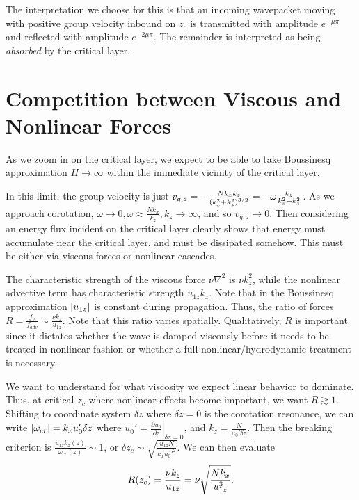 \documentclass[11pt,
        usenames, %
        dvipsnames %
    ]{report}
\newcommand*{\pd}[2]{\frac{\partial#1}{\partial#2}}
\newcommand*{\at}[1]{\left.#1\right|}
\DeclarePairedDelimiter\abs{\lvert}{\rvert}
\DeclarePairedDelimiter\p{\lparen}{\rparen}
\begin{document}
The interpretation we choose for this is that an incoming wavepacket moving with
positive group velocity inbound on $z_c$ is transmitted with amplitude $e^{-\mu
\pi}$ and reflected with amplitude $e^{-2\mu \pi}$. The remainder is interpreted
as being \emph{absorbed} by the critical layer.

\section{Competition between Viscous and Nonlinear Forces}

As we zoom in on the critical layer, we expect to be able to take Boussinesq
approximation $H \to \infty$ within the immediate vicinity of the critical
layer.

In this limit, the group velocity is just $v_{g,z} = -\frac{Nk_xk_z}{\p*{k_x^2 +
k_z^2}^{3/2}} = -\omega\frac{k_z}{k_x^2 + k_z^2}$. As we approach corotation,
$\omega \to 0, \omega \approx \frac{Nk_x}{k_z}, k_z \to \infty$, and so $v_{g,
z} \to 0$. Then considering an energy flux incident on the critical layer
clearly shows that energy must accumulate near the critical layer, and must be
dissipated somehow. This must be either via viscous forces or nonlinear
cascades.

The characteristic strength of the viscous force $\nu \nabla^2$ is $\nu k_z^2$,
while the nonlinear advective term has characteristic strength $u_{1z}k_z$. Note
that in the Boussinesq approximation $\abs*{u_{1z}}$ is constant during
propagation. Thus, the ratio of forces $R = \frac{f_{\nu}}{f_{adv}} \sim
\frac{\nu k_z}{u_{1z}}$. Note that this ratio varies spatially. Qualitatively,
$R$ is important since it dictates whether the wave is damped viscously before
it needs to be treated in nonlinear fashion or whether a full
nonlinear/hydrodynamic treatment is necessary.

We want to understand for what viscosity we expect linear behavior to dominate.
Thus, at critical $z_{c}$ where nonlinear effects become important, we want $R
\gtrsim 1$. Shifting to coordinate system $\delta z$ where $\delta z = 0$ is the
corotation resonance, we can write $\abs*{\omega_{cr}} = k_xu_0' \delta z$ where
$u_0' = \at{\pd{u_0}{z}}_{\delta z = 0}$, and $k_z = \frac{N}{u_0' \delta z}$.
Then the breaking criterion is $\frac{u_{1z}k_z(z)}{\omega_{cr}(z)} \sim 1$, or
$\delta z_{c} \sim \sqrt{\frac{u_{1z}N}{k_xu_0'^2}}$. We can then evaluate
\begin{equation}
    R\p*{z_{c}} = \frac{\nu k_z}{u_{1z}} = \nu \sqrt{\frac{Nk_x}{u_{1z}^3}}.
\end{equation}
\end{document}
